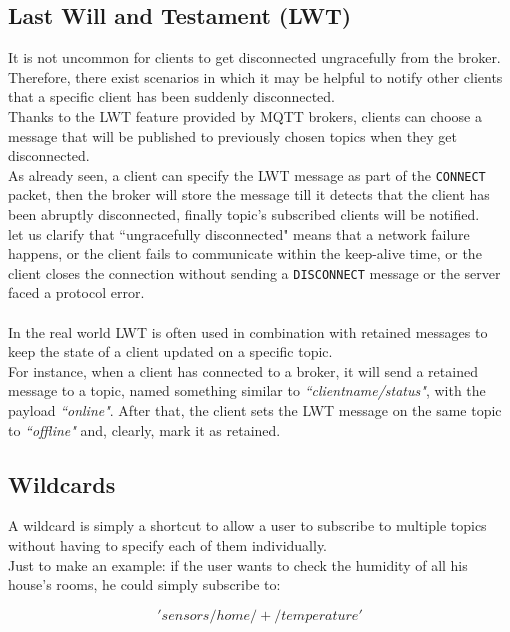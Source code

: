 \documentclass[12pt]{report}
\begin{document}
{\subsection{Last Will and Testament (LWT)}
\label{ssec:lwt}
\bigskip
It is not uncommon for clients to get disconnected ungracefully from the broker.\\
Therefore, there exist scenarios in which it may be helpful to notify other clients that a specific client has been suddenly disconnected.\\
Thanks to the LWT feature provided by MQTT brokers, clients can choose a message that will be published to previously chosen topics when they get disconnected.\\
As already seen, a client can specify the LWT message as part of the \texttt{CONNECT} packet, then the broker will store the message till it detects that the client has been abruptly disconnected, finally topic's subscribed clients will be notified.\\
let us clarify that ``ungracefully disconnected" means that a network failure happens, or the client fails to communicate within the keep-alive time, or the client closes the connection without sending a \texttt{DISCONNECT} message or the server faced a protocol error.\\\\
In the real world LWT is often used in combination with retained messages to keep the state of a client updated on a specific topic.\\
For instance, when a client has connected to a broker, it will send a retained message to a topic, named something similar to \emph{``clientname/status"}, with the payload \emph{``online"}.
After that, the client sets the LWT message on the same topic to \emph{``offline"} and, clearly, mark it as retained.\\

\subsection{Wildcards}
\label{ssec:wildcards}
\bigskip
A wildcard is simply a shortcut to allow a user to subscribe to multiple topics without having to specify each of them individually.\\

Just to make an example: if the user wants to check the humidity of all his house's rooms, he could simply subscribe to:

$$'sensors/home/+/temperature'$$

}
\end{document}

